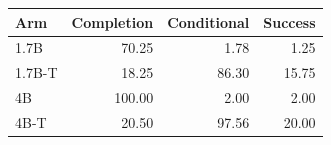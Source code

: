 \begin{tabular}{lrrr}
\toprule
Arm & Completion & Conditional & Success \\
\midrule
1.7B & 70.25 & 1.78 & 1.25 \\
1.7B-T & 18.25 & 86.30 & 15.75 \\
4B & 100.00 & 2.00 & 2.00 \\
4B-T & 20.50 & 97.56 & 20.00 \\
\bottomrule
\end{tabular}